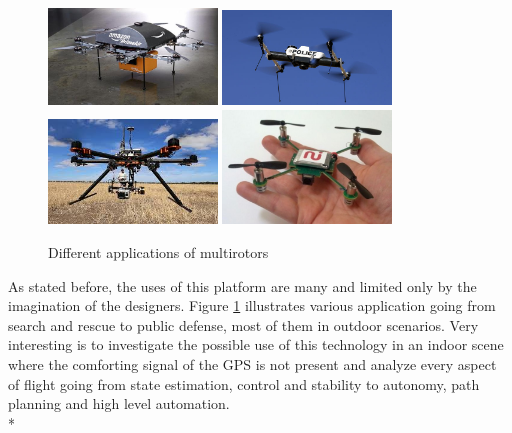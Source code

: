 \begin{figure}[h]
\centering
 \noindent
 \includegraphics[width=0.4\textwidth]{amazon.jpg}\hspace{0.1\textwidth}
 \includegraphics[width=0.4\textwidth]{police-drone.jpg}\\[2em]
 \includegraphics[width=0.4\textwidth]{gopro.jpg}\hspace{0.1\textwidth}
 \includegraphics[width=0.4\textwidth]{microcopter.jpg}\par
 \caption{Different applications of multirotors}
 \label{figure:applications}
\end{figure}


As stated before, the uses of this platform are many and limited
only by the imagination of the designers. Figure \ref{figure:applications} illustrates various application going from search and rescue to public defense, most of them in outdoor scenarios. Very interesting is to investigate the possible use of this technology in an indoor scene where the comforting signal of the GPS is not present and analyze every aspect of flight going from state estimation, control and stability to autonomy, path planning and high level automation. \\*

